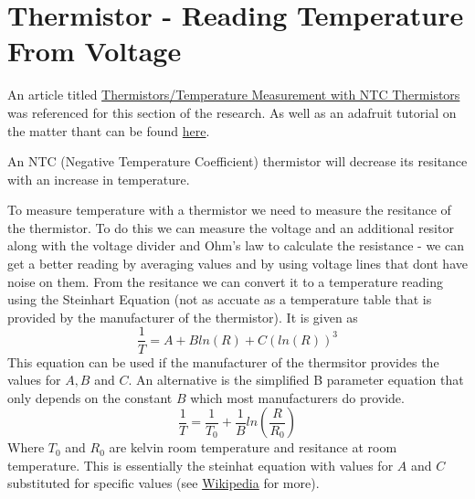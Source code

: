 \documentclass{article}
\begin{document}
	\section{Thermistor - Reading Temperature From Voltage} %
	\label{sec:thermistor_reading_temperature_from_voltage}
	An article titled \href{https://www.jameco.com/Jameco/workshop/techtip/temperature-measurement-ntc-thermistors.html#:~:text=Thermistor%20Response%20to%20Temperature,in%20response%20to%20temperature%20change.}{Thermistors/Temperature Measurement with NTC Thermistors} was referenced for this section of the research. As well as an adafruit tutorial on the matter thant can be found \href{https://learn.adafruit.com/thermistor/using-a-thermistor}{here}.

	An NTC (Negative Temperature Coefficient) thermistor will decrease its resitance with an increase in temperature.

	To measure temperature with a thermistor we need to measure the resitance of the thermistor. To do this we can measure the voltage and an additional resitor along with the voltage divider and Ohm's law to calculate the resistance - we can get a better reading by averaging values and by using voltage lines that dont have noise on them. From the resitance we can convert it to a temperature reading using the Steinhart Equation (not as accuate as a temperature table that is provided by the manufacturer of the thermistor). It is given as 
	\begin{equation}
		\frac{1}{T} = A + Bln(R) + C(ln(R))^3
	\end{equation}
	This equation can be used if the manufacturer of the thermsitor provides the values for $A, B$ and $C$. An alternative is the simplified B parameter equation that only depends on the constant $B$ which most manufacturers do provide. 
	\begin{equation}
	 	\frac{1}{T} = \frac{1}{T_0} + \frac{1}{B}ln(\frac{R}{R_0})
	 \end{equation} 
	 Where $T_0$ and $R_0$ are kelvin room temperature and resitance at room temperature. This is essentially the steinhat equation with values for $A$ and $C$ substituted for specific values (see \href{https://en.wikipedia.org/wiki/Thermistor}{Wikipedia} for more).
	
\end{document}
